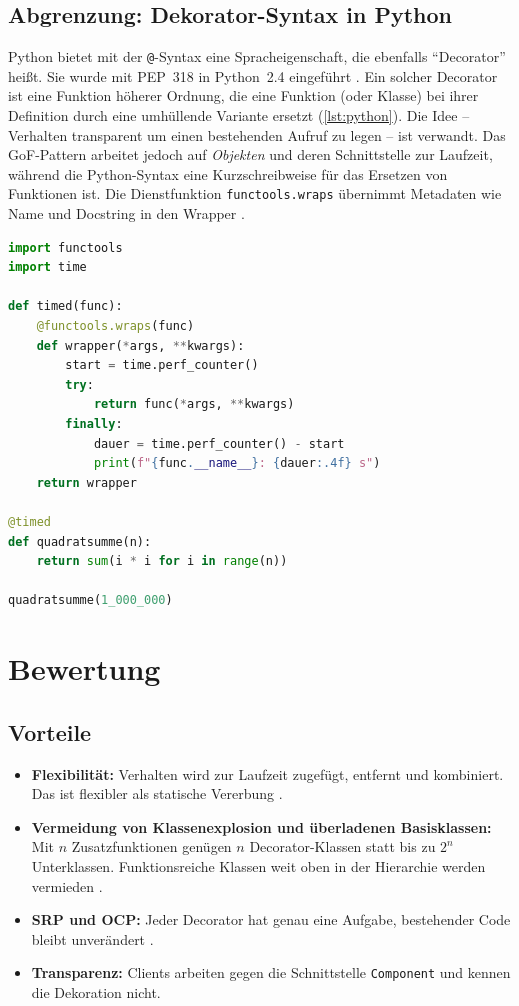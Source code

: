 \documentclass[a4paper,11pt,toc=listof,toc=bibliography]{scrartcl}
\begin{document}
\subsection{Abgrenzung: Dekorator-Syntax in Python}
Python bietet mit der \texttt{@}-Syntax eine Spracheigenschaft, die ebenfalls \enquote{Decorator} heißt. Sie wurde mit \ac{PEP}~318 in Python~2.4 eingeführt \cite{PEP318}. Ein solcher Decorator ist eine Funktion höherer Ordnung, die eine Funktion (oder Klasse) bei ihrer Definition durch eine umhüllende Variante ersetzt (\autoref{lst:python}). Die Idee -- Verhalten transparent um einen bestehenden Aufruf zu legen -- ist verwandt. Das GoF-Pattern arbeitet jedoch auf \emph{Objekten} und deren Schnittstelle zur Laufzeit, während die Python-Syntax eine Kurzschreibweise für das Ersetzen von Funktionen ist. Die Dienstfunktion \texttt{functools.wraps} übernimmt Metadaten wie Name und Docstring in den Wrapper \cite{PYFT}.

\begin{lstlisting}[language=Python,caption={Python-Funktionsdekorator zur Zeitmessung},label={lst:python}]
import functools
import time

def timed(func):
    @functools.wraps(func)
    def wrapper(*args, **kwargs):
        start = time.perf_counter()
        try:
            return func(*args, **kwargs)
        finally:
            dauer = time.perf_counter() - start
            print(f"{func.__name__}: {dauer:.4f} s")
    return wrapper

@timed
def quadratsumme(n):
    return sum(i * i for i in range(n))

quadratsumme(1_000_000)
\end{lstlisting}

\section{Bewertung}
\label{sec:bewertung}

\subsection{Vorteile}
\begin{itemize}
  \item \textbf{Flexibilität:} Verhalten wird zur Laufzeit zugefügt, entfernt und kombiniert. Das ist flexibler als statische Vererbung \cite{GHJV94}.
  \item \textbf{Vermeidung von Klassenexplosion und überladenen Basisklassen:} Mit $n$ Zusatzfunktionen genügen $n$ Decorator-Klassen statt bis zu $2^n$ Unterklassen. Funktionsreiche Klassen weit oben in der Hierarchie werden vermieden \cite{GHJV94}.
  \item \textbf{\acs{SRP} und \acs{OCP}:} Jeder Decorator hat genau eine Aufgabe, bestehender Code bleibt unverändert \cite{Mar03}.
  \item \textbf{Transparenz:} Clients arbeiten gegen die Schnittstelle \texttt{Component} und kennen die Dekoration nicht.
\end{itemize}
\end{document}
